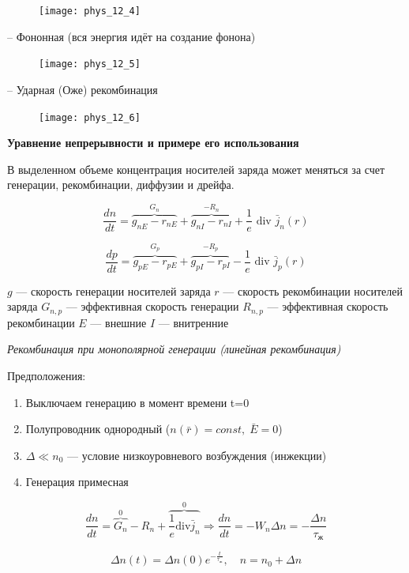 \begin{figure}[h!]
    \centering
    \texttt{[image: phys\_12\_4]}
\end{figure}

-- Фононная (вся энергия идёт на создание фонона)

\begin{figure}[h!]
    \centering
    \texttt{[image: phys\_12\_5]}
\end{figure}

-- Ударная (Оже) рекомбинация

\begin{figure}[h!]
    \centering
    \texttt{[image: phys\_12\_6]}
\end{figure}

\textbf{Уравнение непрерывности и примере его использования}

В выделенном объеме концентрация носителей заряда может меняться за счет генерации, рекомбинации, диффузии и дрейфа.

$$
\frac{d n}{d t}=\overbrace{g_{n E}-r_{n E}}^{G_n}+\overbrace{g_{n I}-r_{n I}}^{-R_n}+\frac{1}{e} \text { div } \bar{j}_n(r)
$$

$$
\frac{d p}{d t}=\overbrace{g_{p E}-r_{p E}}^{G_p}+\overbrace{g_{p I}-r_{p I}}^{-R_p}-\frac{1}{e} \text { div } \bar{j}_p(r)
$$

$g$ --- скорость генерации носителей заряда
$r$ --- скорость рекомбинации носителей заряда
$G_{n,p}$ --- эффективная скорость генерации
$R_{n,p}$ --- эффективная скорость рекомбинации
$E$ --- внешние
$I$ --- внитренние

\textit{Рекомбинация при монополярной генерации (линейная рекомбинация)}

Предположения:

\begin{enumerate}
    \item Выключаем генерацию в момент времени t=0
    \item Полупроводник однородный ($n(\bar{r})=const, \; \bar{E}=0$)
    \item $\Delta \ll n_0$ --- условие низкоуровневого возбуждения (инжекции)
    \item Генерация примесная
\end{enumerate}

$$
\frac{d n}{d t}= \overbrace{G_n}^{0}-R_n+\overbrace{\frac{1}{e} \mathrm{div}\bar{j}_n}^0 \Rightarrow \frac{d n}{d t}=-W_n \Delta n=-\frac{\Delta n}{\tau_\text{ж}}
$$

$$
\Delta n(t)=\Delta n(0) e^{-\frac{t}{\tau_\text{ж}}}, \quad n=n_0+\Delta n
$$

